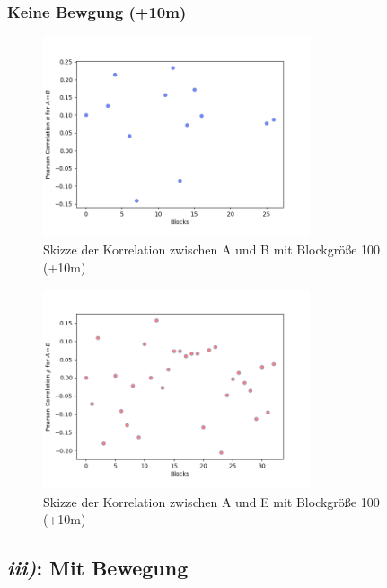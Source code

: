 \documentclass[12pt,a4paper]{article}
\begin{document}
\subsubsection*{Keine Bewgung (+10m)}

\begin{figure}[hbt!]
	\centering
		\includegraphics[width=0.7\textwidth ]
		{Bilder/a3-t3b-ob-block100-correlation-AB.png}
		\caption{Skizze der Korrelation zwischen A und B mit Blockgröße 100 (+10m)}
		\label{fig:Label10}
\end{figure}

\begin{figure}[hbt!]
	\centering
		\includegraphics[width=0.7\textwidth ]
		{Bilder/a3-t3b-ob-block100-correlation-AE.png}
		\caption{Skizze der Korrelation zwischen A und E mit Blockgröße 100 (+10m)}
		\label{fig:Label11}
\end{figure}
\clearpage






\subsection*{\textit{iii)}: Mit Bewegung}
\end{document}
